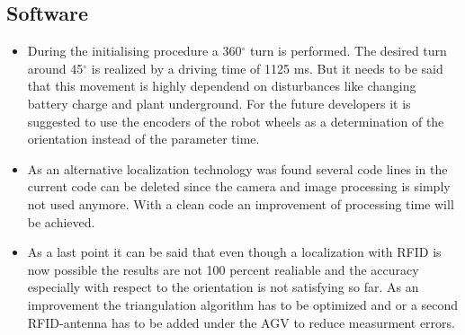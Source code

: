 \subsection{Software}
\begin{itemize}
\item During the initialising procedure a 360$^\circ$ turn is performed. The desired turn around 45$^\circ$ is realized by a driving time of 1125 ms. But it needs to be said that this movement is highly dependend on disturbances like changing battery charge and plant underground. For the future developers it is suggested to use the encoders of the robot wheels as a determination of the orientation instead of the parameter time.
\item As an alternative localization technology was found several code lines in the current code can be deleted since the camera and image processing is simply not used anymore. With a clean code an improvement of processing time will be achieved.
\item As a last point it can be said that even though a localization with RFID is now possible the results are not 100 percent realiable and the accuracy especially with respect to the orientation is not satisfying so far. As an improvement the triangulation algorithm has to be optimized and or a second RFID-antenna has to be added under the AGV to reduce measurment errors.
\end{itemize}